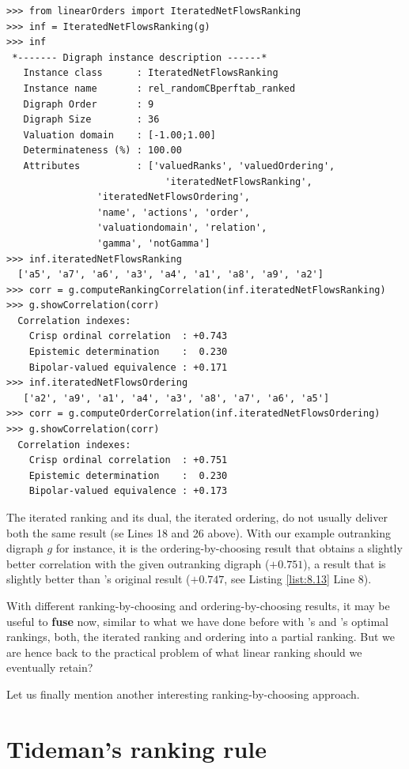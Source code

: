 \begin{lstlisting}[caption={Ordering-by-choosing with iterated minimal \NetFlows scores},label=list:8.14]   
>>> from linearOrders import IteratedNetFlowsRanking  
>>> inf = IteratedNetFlowsRanking(g)
>>> inf
 *------- Digraph instance description ------*
   Instance class      : IteratedNetFlowsRanking
   Instance name       : rel_randomCBperftab_ranked
   Digraph Order       : 9
   Digraph Size        : 36
   Valuation domain    : [-1.00;1.00]
   Determinateness (%) : 100.00
   Attributes          : ['valuedRanks', 'valuedOrdering',
                            'iteratedNetFlowsRanking',
			    'iteratedNetFlowsOrdering',
			    'name', 'actions', 'order',
			    'valuationdomain', 'relation',
			    'gamma', 'notGamma']
>>> inf.iteratedNetFlowsRanking
  ['a5', 'a7', 'a6', 'a3', 'a4', 'a1', 'a8', 'a9', 'a2']
>>> corr = g.computeRankingCorrelation(inf.iteratedNetFlowsRanking)
>>> g.showCorrelation(corr)
  Correlation indexes:
    Crisp ordinal correlation  : +0.743
    Epistemic determination    :  0.230
    Bipolar-valued equivalence : +0.171
>>> inf.iteratedNetFlowsOrdering
   ['a2', 'a9', 'a1', 'a4', 'a3', 'a8', 'a7', 'a6', 'a5']
>>> corr = g.computeOrderCorrelation(inf.iteratedNetFlowsOrdering)
>>> g.showCorrelation(corr)
  Correlation indexes:
    Crisp ordinal correlation  : +0.751
    Epistemic determination    :  0.230
    Bipolar-valued equivalence : +0.173    
\end{lstlisting}

The iterated \NetFlows ranking and its dual, the iterated \NetFlows ordering, do not usually deliver both the same result (se Lines 18 and 26 above). With our example outranking digraph $g$ for instance, it is the ordering-by-choosing result that obtains a slightly better correlation with the given outranking digraph ($+0.751$), a result that is slightly better than \Kohler 's original result ($+0.747$, see Listing \ref{list:8.13} Line 8).

With different ranking-by-choosing and ordering-by-choosing results, it may be useful to \textbf{fuse} now, similar to what we have done before with \Kemeny 's and \Slater 's optimal rankings, both, the iterated \NetFlows ranking and ordering into a partial ranking. But we are hence back to the practical problem of what linear ranking should we eventually retain? 

Let us finally mention another interesting ranking-by-choosing approach.

\section{Tideman's \RankedPairs ranking rule}
\label{sec:8.7}

